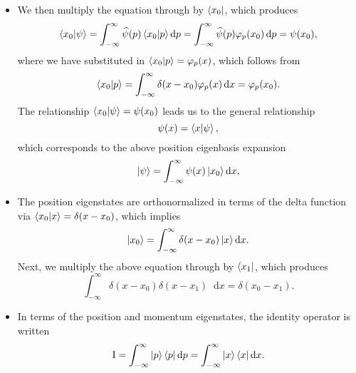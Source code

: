 \documentclass[11pt, a4paper]{article}
\newcommand{\diff}{\mathop{}\!\mathrm{d}} %
\newcommand{\F}[1]{\widehat{#1}} %
\newcommand{\II}{\operatorname{I}}  %
\begin{document}
\begin{itemize}
    \item We then multiply the equation through by $ \bra{x_{0}} $, which produces
    \begin{equation*}
        \braket{x_{0}}{\psi} = \int_{-\infty}^{\infty}\F{\psi}(p)\braket{x_{0}}{p}\diff p = \int_{-\infty}^{\infty}\F{\psi}(p) \varphi_{p}(x_{0})\diff p = \psi(x_{0}),
    \end{equation*}
    where we have substituted in $ \braket{x_{0}}{p} = \varphi_{p}(x) $, which follows from
    \begin{equation*}
        \braket{x_{0}}{p} = \int_{-\infty}^{\infty}\delta(x - x_{0}) \varphi_{p}(x)\diff x = \varphi_{p}(x_{0}).
    \end{equation*}
    The relationship $ \braket{x_{0}}{\psi} = \psi(x_{0}) $ leads us to the general relationship
    \begin{equation*}
        \psi(x) = \braket{x}{\psi},
    \end{equation*}
    which corresponds to the above position eigenbasis expansion
    \begin{equation*}
        \ket{\psi} = \int_{-\infty}^{\infty}\psi(x) \ket{x_{0}} \diff x,
    \end{equation*}
    
    \item The position eigenstates are orthonormalized in terms of the delta function via $ \braket{x_{0}}{x} = \delta(x - x_{0}) $, which implies
    \begin{equation*}
        \ket{x_{0}} = \int_{-\infty}^{\infty}\delta(x - x_{0})\ket{x}\diff x.
    \end{equation*}
    Next, we multiply the above equation through by $ \bra{x_{1}} $, which produces
    \begin{equation*}
        \int_{-\infty}^{\infty}\delta(x - x_{0})\delta(x - x_{1}) \diff x = \delta(x_{0} - x_{1}).
    \end{equation*}
    
    \item In terms of the position and momentum eigenstates, the identity operator is written
    \begin{equation*}
        \II = \int_{-\infty}^{\infty}\ket{p}\bra{p}\diff p = \int_{-\infty}^{\infty}\ket{x}\bra{x}\diff x.
    \end{equation*}
    
\end{itemize}
\end{document}
